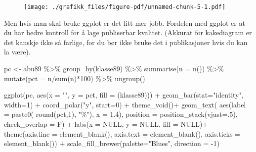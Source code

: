 \documentclass[
  letterpaper,
  DIV=11,
  numbers=noendperiod]{scrreprt}
\newenvironment{Shaded}{\begin{snugshade}}{\end{snugshade}}
\newcommand{\AttributeTok}[1]{\textcolor[rgb]{0.40,0.45,0.13}{#1}}
\newcommand{\ConstantTok}[1]{\textcolor[rgb]{0.56,0.35,0.01}{#1}}
\newcommand{\DecValTok}[1]{\textcolor[rgb]{0.68,0.00,0.00}{#1}}
\newcommand{\FloatTok}[1]{\textcolor[rgb]{0.68,0.00,0.00}{#1}}
\newcommand{\FunctionTok}[1]{\textcolor[rgb]{0.28,0.35,0.67}{#1}}
\newcommand{\NormalTok}[1]{\textcolor[rgb]{0.00,0.23,0.31}{#1}}
\newcommand{\OtherTok}[1]{\textcolor[rgb]{0.00,0.23,0.31}{#1}}
\newcommand{\SpecialCharTok}[1]{\textcolor[rgb]{0.37,0.37,0.37}{#1}}
\newcommand{\StringTok}[1]{\textcolor[rgb]{0.13,0.47,0.30}{#1}}
\theoremstyle{definition}
\theoremstyle{remark}
\begin{document}
\begin{figure}[H]

{\centering \texttt{[image: ./grafikk\_files/figure-pdf/unnamed-chunk-5-1.pdf]}

}

\end{figure}

Men hvis man skal bruke ggplot er det litt mer jobb. Fordelen med ggplot
er at du har bedre kontroll for å lage publiserbar kvalitet. (Akkurat
for kakediagram er det kanskje ikke så farlige, for du bør ikke bruke
det i publikasjoner hvis du kan la være).

\begin{Shaded}
\begin{Highlighting}[]
\NormalTok{pc }\OtherTok{\textless{}{-}}\NormalTok{ abu89 }\SpecialCharTok{\%\textgreater{}\%} 
  \FunctionTok{group\_by}\NormalTok{(klasse89) }\SpecialCharTok{\%\textgreater{}\%} 
  \FunctionTok{summarise}\NormalTok{(}\AttributeTok{n =} \FunctionTok{n}\NormalTok{()) }\SpecialCharTok{\%\textgreater{}\%} 
  \FunctionTok{mutate}\NormalTok{(}\AttributeTok{pct =}\NormalTok{ n}\SpecialCharTok{/}\FunctionTok{sum}\NormalTok{(n)}\SpecialCharTok{*}\DecValTok{100}\NormalTok{) }\SpecialCharTok{\%\textgreater{}\%} 
  \FunctionTok{ungroup}\NormalTok{()}

\FunctionTok{ggplot}\NormalTok{(pc, }\FunctionTok{aes}\NormalTok{(}\AttributeTok{x =} \StringTok{""}\NormalTok{, }\AttributeTok{y =}\NormalTok{ pct, }\AttributeTok{fill =}\NormalTok{ (klasse89))) }\SpecialCharTok{+}
  \FunctionTok{geom\_bar}\NormalTok{(}\AttributeTok{stat=}\StringTok{"identity"}\NormalTok{, }\AttributeTok{width=}\DecValTok{1}\NormalTok{) }\SpecialCharTok{+}
  \FunctionTok{coord\_polar}\NormalTok{(}\StringTok{"y"}\NormalTok{, }\AttributeTok{start=}\DecValTok{0}\NormalTok{) }\SpecialCharTok{+}
  \FunctionTok{theme\_void}\NormalTok{()}\SpecialCharTok{+}
  \FunctionTok{geom\_text}\NormalTok{( }\FunctionTok{aes}\NormalTok{(}\AttributeTok{label =} \FunctionTok{paste0}\NormalTok{( }\FunctionTok{round}\NormalTok{(pct,}\DecValTok{1}\NormalTok{), }\StringTok{"\%"}\NormalTok{), }\AttributeTok{x =} \FloatTok{1.4}\NormalTok{), }
            \AttributeTok{position =} \FunctionTok{position\_stack}\NormalTok{(}\AttributeTok{vjust=}\NormalTok{.}\DecValTok{5}\NormalTok{), }\AttributeTok{check\_overlap =}\NormalTok{ F) }\SpecialCharTok{+}
  \FunctionTok{labs}\NormalTok{(}\AttributeTok{x =} \ConstantTok{NULL}\NormalTok{, }\AttributeTok{y =} \ConstantTok{NULL}\NormalTok{, }\AttributeTok{fill =} \ConstantTok{NULL}\NormalTok{)}\SpecialCharTok{+}
  \FunctionTok{theme}\NormalTok{(}\AttributeTok{axis.line =} \FunctionTok{element\_blank}\NormalTok{(),}
          \AttributeTok{axis.text =} \FunctionTok{element\_blank}\NormalTok{(),}
          \AttributeTok{axis.ticks =} \FunctionTok{element\_blank}\NormalTok{()) }\SpecialCharTok{+}
  \FunctionTok{scale\_fill\_brewer}\NormalTok{(}\AttributeTok{palette=}\StringTok{"Blues"}\NormalTok{, }\AttributeTok{direction =} \SpecialCharTok{{-}}\DecValTok{1}\NormalTok{)}
\end{Highlighting}
\end{Shaded}
\end{document}
